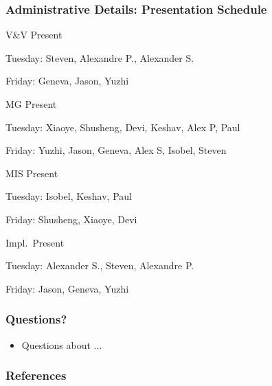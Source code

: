 \documentclass[t,12pt,numbers,fleqn]{beamer}
\begin{document}
\begin{frame}
\frametitle{Administrative Details: Presentation Schedule}

\bi
\item V\&V Present
\bi
\item Tuesday: Steven, Alexandre P., Alexander S.
\item Friday: Geneva, Jason, Yuzhi
\ei
\item MG Present
\bi
\item Tuesday: Xiaoye, Shusheng, Devi, Keshav, Alex P, Paul
\item Friday: Yuzhi, Jason, Geneva, Alex S, Isobel, Steven
\ei
\item MIS Present
\bi
\item Tuesday: Isobel, Keshav, Paul
\item Friday: Shusheng, Xiaoye, Devi
\ei
\item Impl.\ Present
\bi
\item Tuesday: Alexander S., Steven, Alexandre P.
\item Friday: Jason, Geneva, Yuzhi
\ei

\ei

\end{frame}


\begin{frame}
\frametitle{Questions?}
\begin{itemize}
\item Questions about ...
\end{itemize}
\end{frame}


\begin{frame}[allowframebreaks]
\frametitle{References}



\end{frame}

\end{document}
